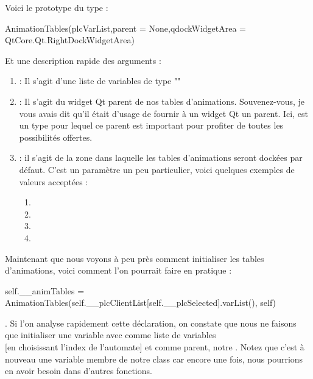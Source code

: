 {Voici le prototype du type  :
\begin{Python}
AnimationTables(plcVarList,parent = None,qdockWidgetArea = QtCore.Qt.RightDockWidgetArea)
\end{Python}
Et une description rapide des arguments :
\begin{enumerate}
    \item {} : Il s'agit d'une liste de variables de type ""
    \item {} : Il s'agit du widget Qt parent de nos tables d'animations. Souvenez-vous, je vous avais dit qu'il était d'usage de fournir à un widget Qt un parent. Ici,  est un type pour lequel ce parent est important pour profiter de toutes les possibilités offertes.
    \item {} : il s'agit de la zone dans laquelle les tables d'animations seront dockées par défaut. C'est un paramètre un peu particulier, voici quelques exemples de valeurs acceptées :
    \begin{enumerate}
        \item {}
        \item {}
        \item {}
        \item {}
    \end{enumerate}
\end{enumerate}


Maintenant que nous voyons à peu près comment initialiser les tables d'animations, voici comment l'on pourrait faire en pratique :
\begin{Python}
self.__animTables = AnimationTables(self.__plcClientList[self.__plcSelected].varList(), self)
\end{Python}
.
Si l'on analyse rapidement cette déclaration, on constate que nous ne faisons que initialiser une variable  avec comme liste de variables \\  [en choisissant l'index de l'automate] et comme parent, notre .\newline
Notez que c'est à nouveau une variable membre de notre class  car encore une fois, nous pourrions en avoir besoin dans d'autres fonctions.\\

}
